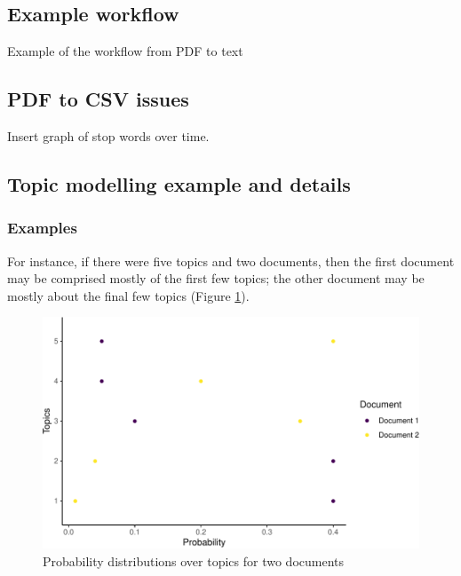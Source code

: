 \documentclass[12pt,]{article}
\theoremstyle{definition}
\theoremstyle{definition}
\theoremstyle{definition}
\theoremstyle{remark}
\begin{document}
\subsection{Example workflow}\label{example-workflow}

Example of the workflow from PDF to text

\subsection{PDF to CSV issues}\label{pdf-to-csv-issues}

Insert graph of stop words over time.

\subsection{Topic modelling example and
details}\label{topic-modelling-example-and-details}

\subsubsection{Examples}\label{examples}

For instance, if there were five topics and two documents, then the
first document may be comprised mostly of the first few topics; the
other document may be mostly about the final few topics (Figure
\ref{fig:topicsoverdocuments}).

\begin{figure}
\centering
\includegraphics{svm-rmarkdown-article-example_files/figure-latex/topicsoverdocuments-1.pdf}
\caption{\label{fig:topicsoverdocuments}Probability distributions over
topics for two documents}
\end{figure}
\end{document}
